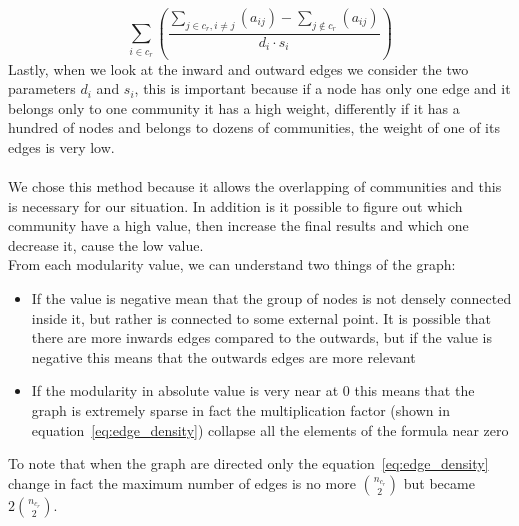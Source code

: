 \documentclass[epsfig,a4paper,11pt,titlepage,twoside,openany]{book}
\begin{document}
\begin{equation}
	\sum\limits_{i \in c_r} \left( \frac{
		\sum\limits_{j \in c_r, i \neq j} \left( a_{ij} \right) - 
		\sum\limits_{j \notin c_r} \left( a_{ij} \right) 
	} {d_i \cdot s_i} \right)
	\label{eq:in-out_edge_relation}
\end{equation}
Lastly, when we look at the inward and outward edges we consider the two parameters $d_i$ and $s_i$, this is important because if a node has only one edge and it belongs only to one community it has a high weight, differently if it has a hundred of nodes and belongs to dozens of communities, the weight of one of its edges is very low.\\
\\
We chose this method because it allows the overlapping of communities and this is necessary for our situation. In addition is it possible to figure out which community have a high value, then increase the final results and which one decrease it, cause the low value.\\
From each modularity value, we can understand two things of the graph:
\begin{itemize}
	\item If the value is negative mean that the group of nodes is not densely connected inside it, but rather is connected to some external point. It is possible that there are more inwards edges compared to the outwards, but if the value is negative this means that the outwards edges are more relevant
	\item If the modularity in absolute value is very near at 0 this means that the graph is extremely sparse in fact the multiplication factor (shown in equation~\ref{eq:edge_density}) collapse all the elements of the formula near zero
\end{itemize}
\noindent To note that when the graph are directed only the equation~\ref{eq:edge_density} change in fact the maximum number of edges is no more $ \displaystyle\binom{n_{c_r}}{2}$ but became $\displaystyle 2\binom{n_{c_r}}{2}$.
%
%
\end{document}

